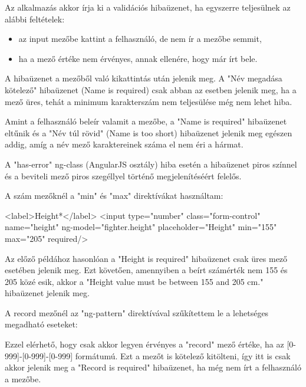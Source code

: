 Az alkalmazás akkor írja ki a validációs hibaüzenet, ha egyszerre teljesülnek az alábbi feltételek:
\begin{itemize}
\item az input mezőbe kattint a felhasználó, de nem ír a mezőbe semmit, 
\item ha a mező értéke nem érvényes, annak ellenére, hogy már írt bele.
\end{itemize}

A hibaüzenet a mezőből való kikattintás után jelenik meg. A "Név megadása kötelező" hibaüzenet (Name is required) csak abban az esetben jelenik meg, ha a mező üres, tehát a minimum karakterszám nem teljesülése még nem lehet hiba.

Amint a felhasználó beleír valamit a mezőbe, a "Name is required" hibaüzenet eltűnik és a "Név túl rövid" (Name is too short) hibaüzenet jelenik meg egészen addig, amíg a név mező karaktereinek száma el nem éri a hármat.

A "has-error" ng-class (AngularJS osztály) hiba esetén a hibaüzenet piros színnel és a beviteli mező piros szegéllyel történő megjelenítéséért felelős.

A szám mezőknél a "min" és "max" direktívákat használtam:

\begin{cpp}
<label>Height*</label>
<input type="number" class="form-control" name="height" 
ng-model="fighter.height" placeholder="Height" min="155" max="205" 
required/>
\end{cpp}

Az előző példához hasonlóan a "Height is required" hibaüzenet csak üres mező esetében jelenik meg. Ezt követően, amennyiben a beírt számérték nem 155 és 205 közé esik, akkor a 
"Height value must be between 155 and 205 cm." hibaüzenet jelenik meg.

A record mezőnél az "ng-pattern" direktívával szűkítettem le a lehetséges megadható eseteket:


Ezzel elérhető, hogy csak akkor legyen érvényes a "record" mező értéke, ha az [0-999]-[0-999]-[0-999] formátumú. Ezt a mezőt is kötelező kitölteni, így itt is csak akkor jelenik meg a "Record is required" hibaüzenet, ha még nem írt a felhasználó a mezőbe.

